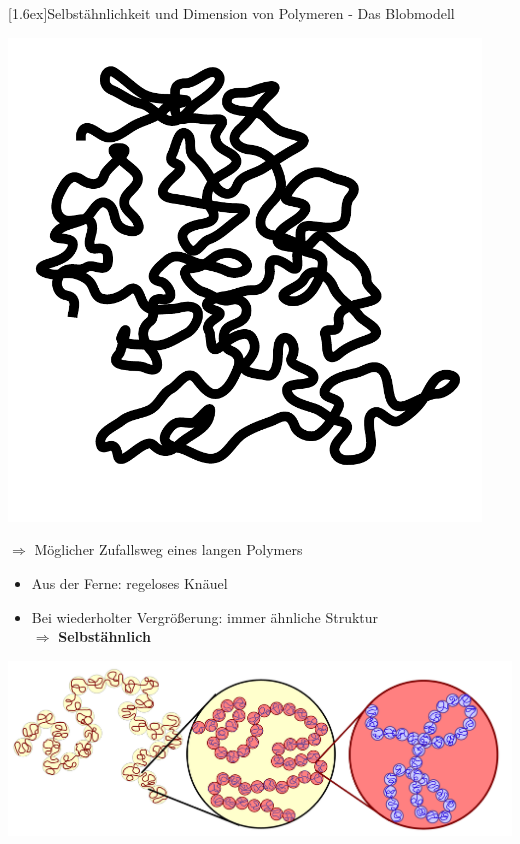 \documentclass[final]{beamer}
\newlength{\columnheight}
\newlength{\marginw}
\newlength{\tw}
\newlength{\colw}
\newenvironment{myTwoColPoster}{%
  \begin{minipage}[t]{\textwidth}%
    \hspace*{\marginw}%
    \hspace*{9.5bp}%
    \begin{minipage}[t]{\tw}}%
  {\end{minipage}%
   \hspace*{\marginw}%
   \end{minipage}}
\newenvironment{myCol}%
    {\begin{minipage}[t][\columnheight][t]{\colw}}%
    {\end{minipage}}
\newenvironment{textblock}[1]%
    {\begin{block}{\rule[-0.6ex]{0pt}{2.4ex}\raisebox{-0.25ex}[1.6ex]{#1}}%
     \vspace*{5mm}}%
    {\vspace*{5mm}\end{block}}
\begin{document}
\begin{frame}[t]{}
\begin{myTwoColPoster}
\begin{myCol}
\begin{textblock}{Selbst\"ahnlichkeit und Dimension von Polymeren - Das Blobmodell}
\begin{center}
\begin{minipage}[c]{0.2\textwidth}
        \includegraphics[width=0.94\textwidth]{fig/RW}
      \end{minipage}\hfill
      \begin{minipage}[c]{0.75\textwidth}
        {\Large $\Longrightarrow$ M\"oglicher Zufallsweg eines langen Polymers}\hspace*{1cm}\vspace*{0.5cm}
        \begin{itemize} \setlength\itemsep{1.1em} \Large
          \item Aus der Ferne: regeloses Kn\"auel
          \item Bei wiederholter Vergrößerung: immer ähnliche Struktur\\[1.2em]
          \textcolor{IPForange}{$\Rightarrow$ \textbf{Selbstähnlich}}
        \end{itemize}
      \end{minipage}
    \end{center}\vspace*{0.8cm}
    \includegraphics[width=1.05\textwidth]{fig/blob_chain}\vspace*{0.8cm}

\end{textblock}
\end{myCol}
\end{myTwoColPoster}
\end{frame}
\end{document}
